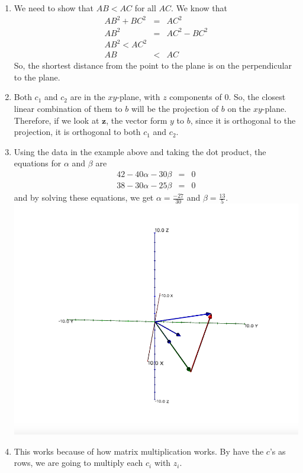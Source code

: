 \documentclass{article}
\begin{document}
\begin{enumerate}
\item We need to show that $AB < AC$ for all $AC$. We know that 
\begin{eqnarray*}
	AB^2 + BC^2 &=& AC^2\\
	AB^2 &=& AC^2 - BC^2\\
	AB^2 < AC^2\\
	AB &<& AC
\end{eqnarray*}
So, the shortest distance from the point to the plane is on the perpendicular to the plane. 

\item Both $c_1$ and $c_2$ are in the $xy$-plane, with $z$ components of 0. So, the closest linear combination of them to $b$ will be the projection of $b$ on the $xy$-plane. Therefore, if we look at $\textbf{z}$, the vector form $y$ to $b$, since it is orthogonal to the projection, it is orthogonal to both $c_1$ and $c_2$. 

\item Using the data in the example above and taking the dot product, the equations for $\alpha$ and $\beta$ are
\begin{eqnarray*}
	42 - 40\alpha - 30\beta &=& 0\\
	38 - 30\alpha -25\beta &=& 0
\end{eqnarray*}
and by solving these equations, we get $\alpha = \frac{-27}{30}$ and $\beta = \frac{13}{5}$. \\
\includegraphics[scale=0.3]{exercise5}

\item This works because of how matrix multiplication works. By have the $c$'s as rows, we are going to multiply each $c_i$ with $z_i$. 


\end{enumerate}
\end{document}
